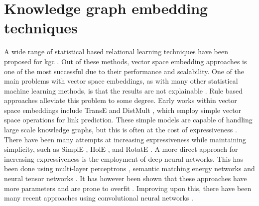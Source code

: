 \section{Knowledge graph embedding techniques}
A wide range of statistical based relational learning techniques have been proposed for \gls{kgc} \cite{nickel2015review}. Out of these methods, vector space embedding approaches is one of the most successful due to their performance and scalability. One of the main problems with vector space embeddings, as with many other statistical machine learning methods, is that the results are not explainable \cite{bonatti2019knowledge}. Rule based approaches alleviate this problem to some degree. Early works within vector space embeddings include TransE \cite{TransE} and DistMult \cite{yang2014embedding}, which employ simple vector space operations for link prediction. These simple models are capable of handling large scale knowledge graphs, but this is often at the cost of expressiveness \cite{dettmers2018convolutional}. There have been many attempts at increasing expressiveness while maintaining simplicity, such as SimplE \cite{SimplE}, HolE \cite{holE}, and RotatE \cite{rotatE}. A more direct approach for increasing expressiveness is the employment of deep neural networks. This has been done using multi-layer perceptrons \cite{dong2014knowledge}, semantic matching energy networks \cite{bordes2014semantic} and neural tensor networks \cite{socher2013reasoning}. It has however been shown that these approaches have more parameters and are prone to overfit \cite{nickel2015review}. Improving upon this, there have been many recent approaches using convolutional neural networks \cite{dettmers2018convolutional, nguyen2017novel, jiang2019adaptive, jiang2021kernel} .


